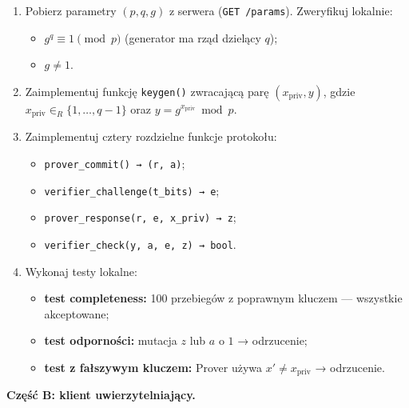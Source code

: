 \documentclass[
]{article}
\providecommand{\tightlist}{%
  \setlength{\itemsep}{0pt}\setlength{\parskip}{0pt}}
\begin{document}
\begin{enumerate}
\def\labelenumi{\arabic{enumi}.}
\tightlist
\item
  Pobierz parametry \((p, q, g)\) z serwera (\texttt{GET\ /params}).
  Zweryfikuj lokalnie:

  \begin{itemize}
  \tightlist
  \item
    \(g^q \equiv 1 \pmod{p}\) (generator ma rząd dzielący \(q\));
  \item
    \(g \neq 1\).
  \end{itemize}
\item
  Zaimplementuj funkcję \texttt{keygen()} zwracającą parę
  \((x_{\mathrm{priv}}, y)\), gdzie
  \(x_{\mathrm{priv}} \in_R \{1, \ldots, q-1\}\) oraz
  \(y = g^{x_{\mathrm{priv}}} \bmod p\).
\item
  Zaimplementuj cztery rozdzielne funkcje protokołu:

  \begin{itemize}
  \tightlist
  \item
    \texttt{prover\_commit()\ →\ (r,\ a)};
  \item
    \texttt{verifier\_challenge(t\_bits)\ →\ e};
  \item
    \texttt{prover\_response(r,\ e,\ x\_priv)\ →\ z};
  \item
    \texttt{verifier\_check(y,\ a,\ e,\ z)\ →\ bool}.
  \end{itemize}
\item
  Wykonaj testy lokalne:

  \begin{itemize}
  \tightlist
  \item
    \textbf{test completeness:} 100 przebiegów z poprawnym kluczem ---
    wszystkie akceptowane;
  \item
    \textbf{test odporności:} mutacja \(z\) lub \(a\) o \(1\) →
    odrzucenie;
  \item
    \textbf{test z fałszywym kluczem:} Prover używa
    \(x' \neq x_{\mathrm{priv}}\) → odrzucenie.
  \end{itemize}
\end{enumerate}

\textbf{Część B: klient uwierzytelniający.}
\end{document}
